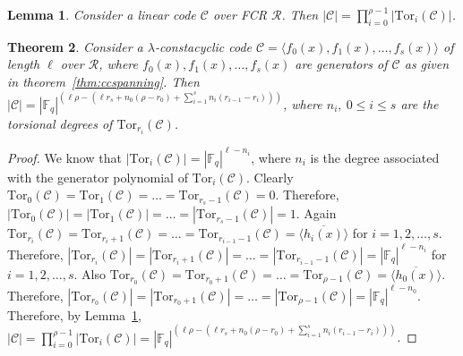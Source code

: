 \documentclass[12pt,a4paper]{article}
\newtheorem{theorem}{Theorem}[section]
\newtheorem{lemma}[theorem]{Lemma}
\begin{document}
\begin{lemma}\label{lem:cardtor}\cite{mehrdad2012torsion}
    Consider a linear code $\mathcal{C}$ over FCR $\mathcal{R}$. Then $|\mathcal{C}|=\prod_{i=0}^{\rho-1}|\mathrm{Tor}_{i}(\mathcal{C})|$.
\end{lemma}
\begin{theorem}\label{thm:cardinality}
    Consider a $\lambda$-constacyclic code $\mathcal{C}= \langle f_0(x),f_1(x), \dots , f_s(x) \rangle $ of length $\ell$ over $\mathcal{R}$, where $f_0(x),f_1(x), \dots ,f_s(x)$ are generators of $\mathcal{C}$ as given in theorem~\ref{thm:ccspanning}. Then $|\mathcal{C}|=|\mathbb{F}_q|^{(\ell\rho-(\ell r_s+n_0(\rho-r_0)+\sum_{i=1}^sn_i(r_{i-1}-r_i)))}$, where $n_i,~ 0 \le i \le s$ are the torsional degrees of $\mathrm{Tor}_{r_i}(\mathcal{C})$.
\end{theorem}
\begin{proof}
    We know that $|\mathrm{Tor}_{i}(\mathcal{C})|=|\mathbb{F}_q|^{\ell-n_i}$, where $n_i$ is the degree associated with the generator polynomial of  $\mathrm{Tor}_{i}(\mathcal{C})$. Clearly $\mathrm{Tor}_{0}(\mathcal{C})=\mathrm{Tor}_{1}(\mathcal{C})= \dots =\mathrm{Tor}_{r_s-1}(\mathcal{C})={0}$. Therefore, $|\mathrm{Tor}_{0}(\mathcal{C})|=|\mathrm{Tor}_{1}(\mathcal{C})|= \dots =|\mathrm{Tor}_{r_s-1}(\mathcal{C})|=1$. Again $\mathrm{Tor}_{r_i}(\mathcal{C})=\mathrm{Tor}_{r_i+1}(\mathcal{C})= \dots =\mathrm{Tor}_{r_{i-1}-1}(\mathcal{C})=\langle \overline{h_i(x)} \rangle$ for $i=1,2,\dots,s$. Therefore, $|\mathrm{Tor}_{r_i}(\mathcal{C})|=|\mathrm{Tor}_{r_i+1}(\mathcal{C})|= \dots =|\mathrm{Tor}_{r_{i-1}-1}(\mathcal{C})|=|\mathbb{F}_q|^{\ell-n_i}$ for $i=1,2,\dots,s$. Also $\mathrm{Tor}_{r_0}(\mathcal{C})=\mathrm{Tor}_{r_0+1}(\mathcal{C})= \dots =\mathrm{Tor}_{\rho-1}(\mathcal{C})=\langle \overline{h_0(x)} \rangle$. Therefore, $|\mathrm{Tor}_{r_0}(\mathcal{C})|=|\mathrm{Tor}_{r_0+1}(\mathcal{C})|= \dots =|\mathrm{Tor}_{\rho-1}(\mathcal{C})|=|\mathbb{F}_q|^{\ell-n_0}$. Therefore, by Lemma~\ref{lem:cardtor}, $|\mathcal{C}|=\prod_{i=0}^{\rho-1}|\mathrm{Tor}_{i}(\mathcal{C})|=|\mathbb{F}_q|^{(\ell\rho-(\ell r_s+n_0(\rho-r_0)+\sum_{i=1}^sn_i(r_{i-1}-r_i)))}$.
\end{proof}
\end{document}
